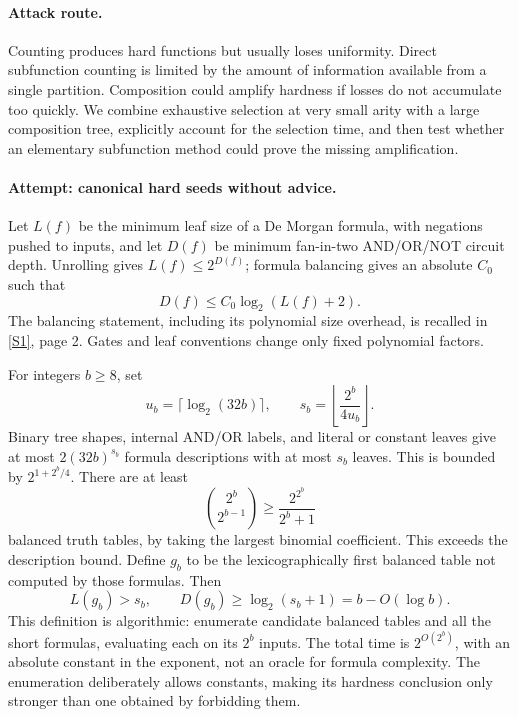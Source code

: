 \documentclass[11pt,a4paper]{article}
\newcommand{\sref}[2]{\hyperlink{source:#1:#2}{[S#2]}}
\numberwithin{equation}{section}
\begin{document}
\paragraph{Attack route.}
Counting produces hard functions but usually loses uniformity. Direct subfunction counting is limited by the amount of information available from a single partition. Composition could amplify hardness if losses do not accumulate too quickly. We combine exhaustive selection at very small arity with a large composition tree, explicitly account for the selection time, and then test whether an elementary subfunction method could prove the missing amplification.

\paragraph{Attempt: canonical hard seeds without advice.}
Let $L(f)$ be the minimum leaf size of a De Morgan formula, with negations pushed to inputs, and let $D(f)$ be minimum fan-in-two AND/OR/NOT circuit depth. Unrolling gives $L(f)\le2^{D(f)}$; formula balancing gives an absolute $C_0$ such that
\begin{equation}\label{r69:balance}
 D(f)\le C_0\log_2(L(f)+2).
\end{equation}
The balancing statement, including its polynomial size overhead, is recalled in \sref{69}{1}, page 2. Gates and leaf conventions change only fixed polynomial factors.

For integers $b\ge8$, set
\[
 u_b=\lceil\log_2(32b)\rceil,\qquad
 s_b=\left\lfloor\frac{2^b}{4u_b}\right\rfloor.
\]
Binary tree shapes, internal AND/OR labels, and literal or constant leaves give at most $2(32b)^{s_b}$ formula descriptions with at most $s_b$ leaves. This is bounded by $2^{1+2^b/4}$. There are at least
\[
 \binom{2^b}{2^{b-1}}\ge\frac{2^{2^b}}{2^b+1}
\]
balanced truth tables, by taking the largest binomial coefficient. This exceeds the description bound. Define $g_b$ to be the lexicographically first balanced table not computed by those formulas. Then
\begin{equation}\label{r69:seed}
 L(g_b)>s_b,\qquad D(g_b)\ge\log_2(s_b+1)=b-O(\log b).
\end{equation}
This definition is algorithmic: enumerate candidate balanced tables and all the short formulas, evaluating each on its $2^b$ inputs. The total time is $2^{O(2^b)}$, with an absolute constant in the exponent, not an oracle for formula complexity. The enumeration deliberately allows constants, making its hardness conclusion only stronger than one obtained by forbidding them.
\end{document}
